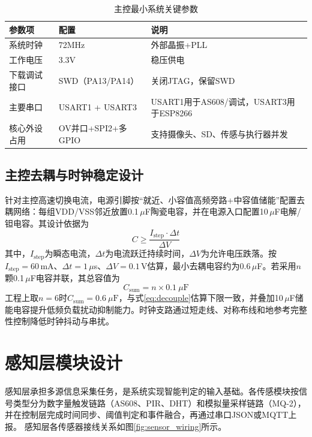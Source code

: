 \documentclass[UTF8,12pt,a4paper,oneside]{ctexbook}
\renewcommand{\arraystretch}{1.15}
\numberwithin{equation}{chapter}
\let\cite\supercite
\begin{document}
\begin{table}[htbp]
\centering
\caption{主控最小系统关键参数}
\label{tab:mcu_min_params}
\renewcommand{\arraystretch}{1.15}
\begin{tabular}{>{\raggedright\arraybackslash}p{3.3cm} >{\raggedright\arraybackslash}p{2.9cm} >{\raggedright\arraybackslash}p{6.4cm}}
\toprule
参数项 & 配置 & 说明 \\
\midrule
系统时钟 & 72MHz & 外部晶振+PLL \\
工作电压 & 3.3V & 稳压供电 \\
下载调试接口 & SWD（PA13/PA14） & 关闭JTAG，保留SWD \\
主要串口 & USART1 + USART3 & USART1用于AS608/调试，USART3用于ESP8266 \\
核心外设占用 & OV并口+SPI2+多GPIO & 支持摄像头、SD、传感与执行器并发 \\
\bottomrule
\end{tabular}
\end{table}
\subsection{主控去耦与时钟稳定设计}
针对主控高速切换电流，电源引脚按“就近、小容值高频旁路+中容值储能”配置去耦网络：每组VDD/VSS邻近放置0.1\,$\mu$F陶瓷电容，并在电源入口配置10\,$\mu$F电解/钽电容。其设计依据为
\begin{equation}
C \ge \frac{I_{\mathrm{step}}\cdot \Delta t}{\Delta V}
\label{eq:decouple}
\end{equation}
其中，$I_{\mathrm{step}}$为瞬态电流，$\Delta t$为电流跃迁持续时间，$\Delta V$为允许电压跌落。按$I_{\mathrm{step}}=60$\,mA、$\Delta t=1$\,$\mu$s、$\Delta V=0.1$\,V估算，最小去耦电容约为0.6\,$\mu$F。若采用$n$颗0.1\,$\mu$F电容并联，其总容值为
\begin{equation}
C_{\mathrm{sum}}=n\times 0.1\ \mu \mathrm{F}
\label{eq:decouple_parallel}
\end{equation}
工程上取$n=6$时$C_{\mathrm{sum}}=0.6\ \mu\mathrm{F}$，与式\eqref{eq:decouple}估算下限一致，并叠加10\,$\mu$F储能电容提升低频负载扰动抑制能力。时钟支路通过短走线、对称布线和地参考完整性控制降低时钟抖动与串扰。
\section{感知层模块设计}
感知层承担多源信息采集任务，是系统实现智能判定的输入基础。各传感模块按信号类型分为数字量触发链路（AS608、PIR、DHT）和模拟量采样链路（MQ-2），并在控制层完成时间同步、阈值判定和事件融合，再通过串口JSON或MQTT上报\cite{as608_manual,hcsr501_datasheet,dht22_datasheet,mq2_datasheet,ov7670_datasheet}。
感知层各传感器接线关系如图\ref{fig:sensor_wiring}所示。
\end{document}

